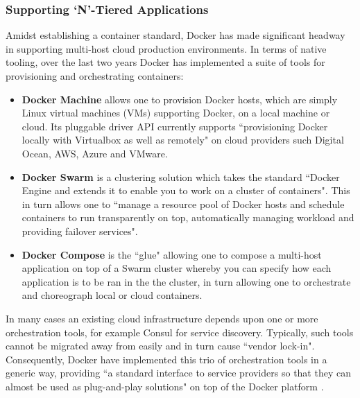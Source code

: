 \documentclass{report}
\begin{document}
\subsubsection{Supporting `N'-Tiered Applications}
Amidst establishing a container standard, Docker has made significant headway in 
supporting multi-host cloud production environments. In terms of native tooling, over the last two years Docker has implemented
a suite of tools for provisioning and orchestrating containers:
\begin{itemize}
\item \textbf{Docker Machine} allows one to provision Docker hosts, which are simply Linux virtual machines (VMs) supporting Docker, on a local machine or cloud. 
Its pluggable driver API currently supports ``provisioning Docker locally with Virtualbox as well as remotely" on cloud providers such Digital Ocean, AWS, Azure and VMware.
\item \textbf{Docker Swarm} is a clustering solution which takes the standard 
``Docker Engine and extends it to enable you to work on a cluster of containers". 
This in turn allows one to ``manage a resource pool of Docker hosts and schedule
containers to run transparently on top, automatically managing workload and providing failover services".
\item \textbf{Docker Compose} is the ``glue" allowing one to compose a multi-host application on top of a Swarm cluster whereby you
can specify how each application is to be ran in the the cluster, in turn allowing one to orchestrate and choreograph local or cloud containers.
\end{itemize}
\noindent In many cases an existing cloud infrastructure depends upon one or more orchestration tools, for example 
Consul for service discovery. Typically, such tools cannot be migrated away from easily and in turn cause ``vendor lock-in".
Consequently, Docker have implemented this trio of orchestration tools in a generic way, 
providing ``a standard interface to service providers so that they can almost be used as plug-and-play solutions" on top of the Docker platform \citep{holla}.
\end{document}
